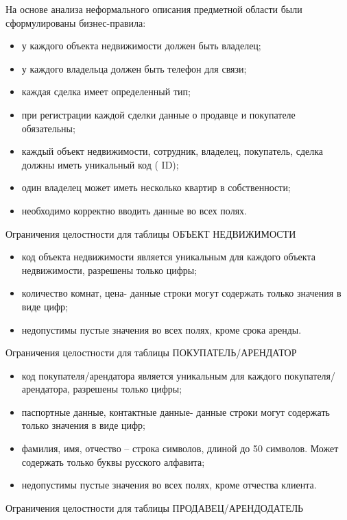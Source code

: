 На основе анализа неформального описания предметной области были сформулированы бизнес-правила:
\begin{itemize}
\item	у каждого объекта недвижимости должен быть владелец;

\item	у каждого владельца должен быть телефон для связи;

\item	каждая сделка имеет определенный тип;

\item	при регистрации каждой сделки данные о продавце и покупателе обязательны;

\item	каждый объект недвижимости, сотрудник, владелец, покупатель, сделка должны иметь уникальный код ( ID);

\item	один владелец может иметь несколько квартир в собственности;

\item	необходимо корректно вводить данные во всех полях.
\end{itemize}
Ограничения целостности для таблицы ОБЪЕКТ НЕДВИЖИМОСТИ
\begin{itemize}
\item	код объекта недвижимости является уникальным для каждого объекта недвижимости, разрешены только цифры;

\item	количество комнат, цена- данные строки могут содержать только значения в виде цифр;

\item	недопустимы пустые значения во всех полях, кроме срока аренды.
\end{itemize}
Ограничения целостности для таблицы ПОКУПАТЕЛЬ/АРЕНДАТОР
\begin{itemize}
\item	код покупателя/арендатора является уникальным для каждого покупателя/арендатора, разрешены только цифры;

\item	паспортные данные, контактные данные- данные строки могут содержать только значения в виде цифр;

\item	фамилия, имя, отчество – строка символов, длиной до 50 символов. Может содержать только буквы русского алфавита;

\item	недопустимы пустые значения во всех полях, кроме отчества клиента.
\end{itemize}
Ограничения целостности для таблицы ПРОДАВЕЦ/АРЕНДОДАТЕЛЬ

